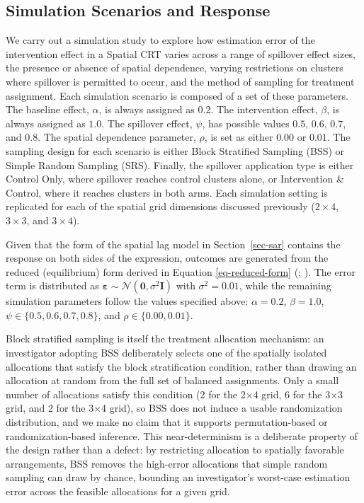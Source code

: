 \documentclass[
  12pt,
  prelim]{bios-prelim}
\begin{document}
\subsection{Simulation Scenarios and
Response}\label{simulation-scenarios-and-response}

We carry out a simulation study to explore how estimation error of the
intervention effect in a Spatial CRT varies across a range of spillover
effect sizes, the presence or absence of spatial dependence, varying
restrictions on clusters where spillover is permitted to occur, and the
method of sampling for treatment assignment. Each simulation scenario is
composed of a set of these parameters. The baseline effect, \(\alpha\),
is always assigned as \(0.2\). The intervention effect, \(\beta\), is
always assigned as \(1.0\). The spillover effect, \(\psi\), has possible
values \(0.5\), \(0.6\), \(0.7\), and \(0.8\). The spatial dependence
parameter, \(\rho\), is set as either \(0.00\) or \(0.01\). The sampling
design for each scenario is either Block Stratified Sampling (BSS) or
Simple Random Sampling (SRS). Finally, the spillover application type is
either Control Only, where spillover reaches control clusters alone, or
Intervention \& Control, where it reaches clusters in both arms. Each
simulation setting is replicated for each of the spatial grid dimensions
discussed previously (\(2\times4\), \(3\times3\), and \(3\times4\)).

Given that the form of the spatial lag model in Section~\ref{sec-sar}
contains the response on both sides of the expression, outcomes are
generated from the reduced (equilibrium) form derived in Equation
\ref{eq-reduced-form} (; ). The error term is distributed as
\(\boldsymbol\varepsilon \sim \mathcal{N}(\mathbf{0},
\sigma^2\mathbf{I})\) with \(\sigma^2 = 0.01\), while the remaining
simulation parameters follow the values specified above:
\(\alpha = 0.2\), \(\beta = 1.0\), \(\psi \in \{0.5, 0.6, 0.7, 0.8\}\),
and \(\rho \in \{0.00, 0.01\}\).

Block stratified sampling is itself the treatment allocation mechanism:
an investigator adopting BSS deliberately selects one of the spatially
isolated allocations that satisfy the block stratification condition,
rather than drawing an allocation at random from the full set of
balanced assignments. Only a small number of allocations satisfy this
condition (2 for the 2×4 grid, 6 for the 3×3 grid, and 2 for the 3×4
grid), so BSS does not induce a usable randomization distribution, and
we make no claim that it supports permutation-based or
randomization-based inference. This near-determinism is a deliberate
property of the design rather than a defect: by restricting allocation
to spatially favorable arrangements, BSS removes the high-error
allocations that simple random sampling can draw by chance, bounding an
investigator's worst-case estimation error across the feasible
allocations for a given grid.
\end{document}
